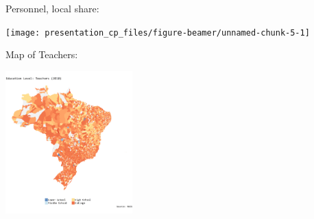 \documentclass[ignorenonframetext,]{beamer}
\begin{document}
\begin{frame}{Personnel, local share:}

\begin{center}\texttt{[image: presentation\_cp\_files/figure-beamer/unnamed-chunk-5-1]} \end{center}

\end{frame}

\begin{frame}{Map of Teachers:}

\begin{center}\includegraphics[width=185px]{map_teacher} \end{center}

\end{frame}
\end{document}
